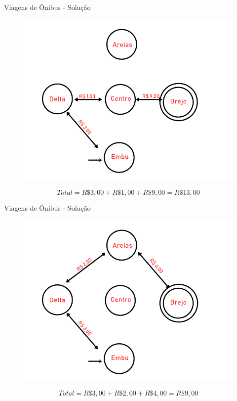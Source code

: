\documentclass{beamer}
\begin{document}
\begin{frame}{Viagens de Ônibus - Solução}
\begin{figure}[ht]
\centering
\includegraphics[width=.7\textwidth]{caminho2.png}
\label{fig:exampleFig2}
\end{figure}

\begin{equation*}
    Total = R\$3,00 + R\$1,00 + R\$9,00 = R\$13,00  
\end{equation*}

\end{frame}


\begin{frame}{Viagens de Ônibus - Solução}
\begin{figure}[ht]
\centering
\includegraphics[width=.7\textwidth]{caminho3.png}
\label{fig:exampleFig2}
\end{figure}
\begin{equation*}
    Total = R\$3,00 + R\$2,00 + R\$4,00 = R\$9,00  
\end{equation*}
\end{frame}
\end{document}
